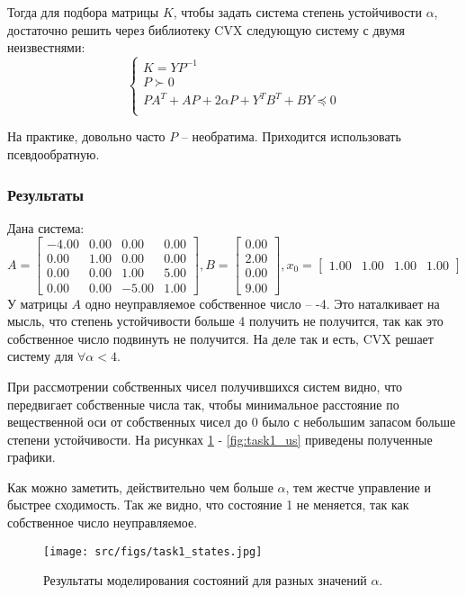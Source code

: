 Тогда для подбора матрицы \(K\), чтобы задать система степень устойчивости \(\alpha\), достаточно решить через библиотеку CVX следующую систему с двумя неизвестнями:
\[
        \begin{cases}
                K = YP^{-1}\\
                P \succ 0 \\
                PA^T + AP + 2 \alpha P + Y^T B^T + BY \preccurlyeq 0  \\
        \end{cases} 
\]

На практике, довольно часто \(P\) -- необратима. Приходится использовать псевдообратную.

\subsubsection{Результаты}
Дана система:
\[A = \begin{bmatrix}
        -4.00 &  0.00 &  0.00 &  0.00\\
         0.00 &  1.00 &  0.00 &  0.00\\
         0.00 &  0.00 &  1.00 &  5.00\\
         0.00 &  0.00 & -5.00 &  1.00
       \end{bmatrix},
       B = \begin{bmatrix}
        0.00\\
        2.00\\
        0.00\\
        9.00
      \end{bmatrix},
      x_0 = \begin{bmatrix}
        1.00 &  1.00 &  1.00 &  1.00
      \end{bmatrix}
       \]
У матрицы \(A\) одно неуправляемое собственное число -- -4.
 Это наталкивает на мысль, что степень устойчивости больше 4 получить не получится, так как это собственное число подвинуть не получится. 
 На деле так и есть, CVX решает систему для \(\forall \alpha < 4\).

 При рассмотрении собственных чисел получившихся систем видно, что передвигает собственные числа так, чтобы минимальное расстояние по вещественной оси от собственных чисел до 0 было с небольшим запасом больше степени устойчивости. 
 На рисунках \ref{fig:task1_states} - \ref*{fig:task1_us} приведены полученные графики.

Как можно заметить, действительно чем больше \(\alpha\), тем жестче управление и быстрее сходимость. Так же видно, что состояние 1 не меняется, так как собственное число неуправляемое.
\begin{figure}[ht!]
        \centering
        \texttt{[image: src/figs/task1\_states.jpg]}
        \caption{Результаты моделирования состояний для разных значений \(\alpha\).}
        \label{fig:task1_states}
\end{figure}

